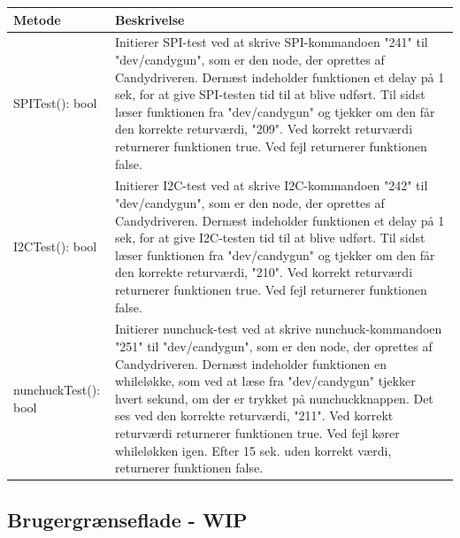 \begin{table}[H]
	\centering
	\label{realIdriverFunktioner}
	\begin{tabular}{|l|l|}
		\hline
		\textbf{Metode}      & \textbf{Beskrivelse}                                                                                                                                                                                                                                                                                                                                                                                                                                                           \\ \hline
		SPITest(): bool      & Initierer SPI-test ved at skrive SPI-kommandoen "241" til "dev/candygun", som er den node, der oprettes af Candydriveren. Dernæst indeholder funktionen et delay på 1 sek, for at give SPI-testen tid til at blive udført. Til sidst læser funktionen fra "dev/candygun" og tjekker om den får den korrekte returværdi, "209". Ved korrekt returværdi returnerer funktionen true. Ved fejl returnerer funktionen false.                                                        \\ \hline
		I2CTest(): bool      & Initierer I2C-test ved at skrive I2C-kommandoen "242" til "dev/candygun", som er den node, der oprettes af Candydriveren. Dernæst indeholder funktionen et delay på 1 sek, for at give I2C-testen tid til at blive udført. Til sidst læser funktionen fra "dev/candygun" og tjekker om den får den korrekte returværdi, "210". Ved korrekt returværdi returnerer funktionen true. Ved fejl returnerer funktionen false.                                                        \\ \hline
		nunchuckTest(): bool & Initierer nunchuck-test ved at skrive nunchuck-kommandoen "251" til "dev/candygun", som er den node, der oprettes af Candydriveren. Dernæst indeholder funktionen en whileløkke, som ved at læse fra "dev/candygun" tjekker hvert sekund, om der er trykket på nunchuckknappen. Det ses ved den korrekte returværdi, "211". Ved korrekt returværdi returnerer funktionen true. Ved fejl kører whileløkken igen. Efter 15 sek. uden korrekt værdi, returnerer funktionen false. \\ \hline
	\end{tabular}
\end{table}

\subsection{Brugergrænseflade - WIP}


